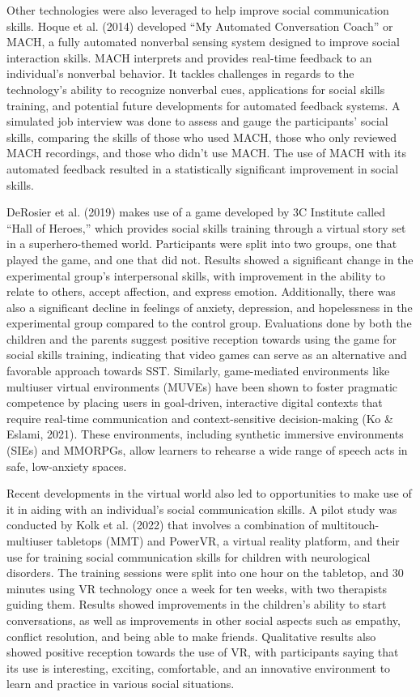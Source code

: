 Other technologies were also leveraged to help improve social communication skills. Hoque et al. (2014) developed “My Automated Conversation Coach” or MACH, a fully automated nonverbal sensing system designed to improve social interaction skills. MACH interprets and provides real-time feedback to an individual’s nonverbal behavior. It tackles challenges in regards to the technology’s ability to recognize nonverbal cues, applications for social skills training, and potential future developments for automated feedback systems. A simulated job interview was done to assess and gauge the participants’ social skills, comparing the skills of those who used MACH, those who only reviewed MACH recordings, and those who didn’t use MACH. The use of MACH with its automated feedback resulted in a statistically significant improvement in social skills.

DeRosier et al. (2019) makes use of a game developed by 3C Institute called “Hall of Heroes,” which provides social skills training through a virtual story set in a superhero-themed world. Participants were split into two groups, one that played the game, and one that did not. Results showed a significant change in the experimental group’s interpersonal skills, with improvement in the ability to relate to others, accept affection, and express emotion. Additionally, there was also a significant decline in feelings of anxiety, depression, and hopelessness in the experimental group compared to the control group. Evaluations done by both the children and the parents suggest positive reception towards using the game for social skills training, indicating that video games can serve as an alternative and favorable approach towards SST. Similarly, game-mediated environments like multiuser virtual environments (MUVEs) have been shown to foster pragmatic competence by placing users in goal-driven, interactive digital contexts that require real-time communication and context-sensitive decision-making (Ko \& Eslami, 2021). These environments, including synthetic immersive environments (SIEs) and MMORPGs, allow learners to rehearse a wide range of speech acts in safe, low-anxiety spaces.

Recent developments in the virtual world also led to opportunities to make use of it in aiding with an individual’s social communication skills. A pilot study was conducted by Kolk et al. (2022) that involves a combination of multitouch-multiuser tabletops (MMT) and PowerVR, a virtual reality platform, and their use for training social communication skills for children with neurological disorders. The training sessions were split into one hour on the tabletop, and 30 minutes using VR technology once a week for ten weeks, with two therapists guiding them. Results showed improvements in the children’s ability to start conversations, as well as improvements in other social aspects such as empathy, conflict resolution, and being able to make friends. Qualitative results also showed positive reception towards the use of VR, with participants saying that its use is interesting, exciting, comfortable, and an innovative environment to learn and practice in various social situations.

